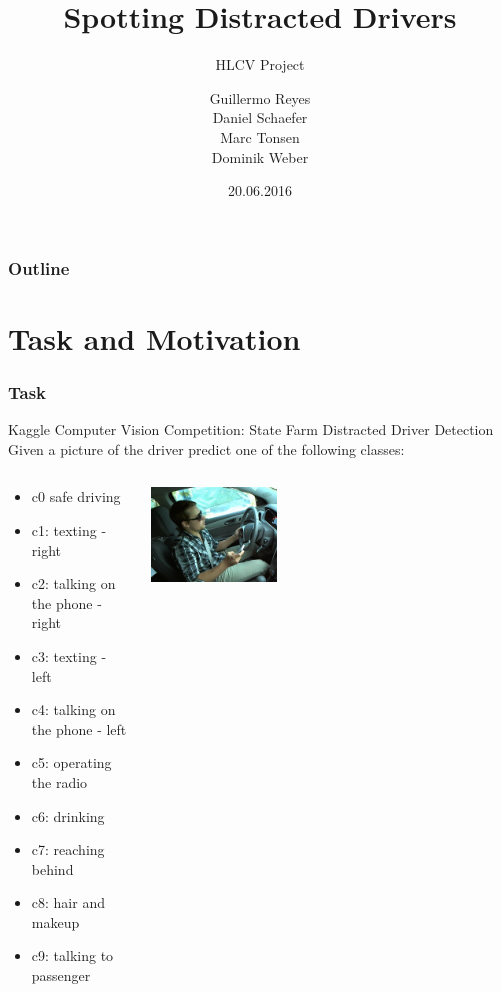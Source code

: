 \documentclass{beamer}
\title{Spotting Distracted Drivers}
\subtitle{HLCV Project}
\author[Reyes, Schaefer, Tonsen, Weber]{Guillermo Reyes \\
	 Daniel Schaefer \\
	 Marc Tonsen \\
 Dominik Weber\\}
\institute[]{Saarland University}
\date{20.06.2016}
\begin{document}
	\begin{frame}
		\titlepage
	\end{frame}
	
	\begin{frame}
		\frametitle{Outline}
		\tableofcontents
	\end{frame}
	
	\section{Task and Motivation}	
	\begin{frame}
		\frametitle{Task}
		Kaggle Computer Vision Competition: State Farm Distracted Driver Detection \\
		Given a picture of the driver predict one of the following classes:
		\begin{columns}
			\begin{column}{0.5\textwidth}
				\begin{itemize}
					\item c0 safe driving
					\item c1: texting - right
					\item c2: talking on the phone - right
					\item c3: texting - left
					\item c4: talking on the phone - left
					\item c5: operating the radio
					\item c6: drinking
					\item c7: reaching behind
					\item c8: hair and makeup
					\item c9: talking to passenger			
				\end{itemize}
			\end{column}
			\begin{column}{0.35\textwidth}  %
				\begin{center}
					\includegraphics[width=0.35\textwidth]{img_6}
				\end{center}
			\end{column}
		\end{columns}
		
	\end{frame}
	
\end{document}
